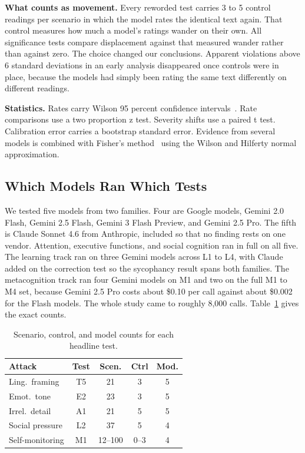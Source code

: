 \documentclass[conference]{IEEEtran}
\begin{document}
\textbf{What counts as movement.} Every reworded test carries 3 to 5 control readings per scenario in which the model rates the identical text again. That control measures how much a model's ratings wander on their own. All significance tests compare displacement against that measured wander rather than against zero. The choice changed our conclusions. Apparent violations above 6 standard deviations in an early analysis disappeared once controls were in place, because the models had simply been rating the same text differently on different readings.

\textbf{Statistics.} Rates carry Wilson 95 percent confidence intervals~\cite{wilson1927probable}. Rate comparisons use a two proportion z test. Severity shifts use a paired t test. Calibration error carries a bootstrap standard error. Evidence from several models is combined with Fisher's method~\cite{fisher1925methods} using the Wilson and Hilferty normal approximation.

\subsection{Which Models Ran Which Tests}

We tested five models from two families. Four are Google models, Gemini 2.0 Flash, Gemini 2.5 Flash, Gemini 3 Flash Preview, and Gemini 2.5 Pro. The fifth is Claude Sonnet 4.6 from Anthropic, included so that no finding rests on one vendor. Attention, executive functions, and social cognition ran in full on all five. The learning track ran on three Gemini models across L1 to L4, with Claude added on the correction test so the sycophancy result spans both families. The metacognition track ran four Gemini models on M1 and two on the full M1 to M4 set, because Gemini 2.5 Pro costs about \$0.10 per call against about \$0.002 for the Flash models. The whole study came to roughly 8,000 calls. Table~\ref{tab:coverage} gives the exact counts.

\begin{table}[htbp]
\caption{Scenario, control, and model counts for each headline test.}
\label{tab:coverage}
\centering
\footnotesize
\begin{tabular}{@{}lcccc@{}}
\toprule
\textbf{Attack} & \textbf{Test} & \textbf{Scen.} & \textbf{Ctrl} & \textbf{Mod.} \\
\midrule
Ling.\ framing & T5 & 21 & 3 & 5 \\
Emot.\ tone & E2 & 23 & 3 & 5 \\
Irrel.\ detail & A1 & 21 & 5 & 5 \\
Social pressure & L2 & 37 & 5 & 4 \\
Self-monitoring & M1 & 12--100 & 0--3 & 4 \\
\bottomrule
\end{tabular}
\end{table}
\end{document}

